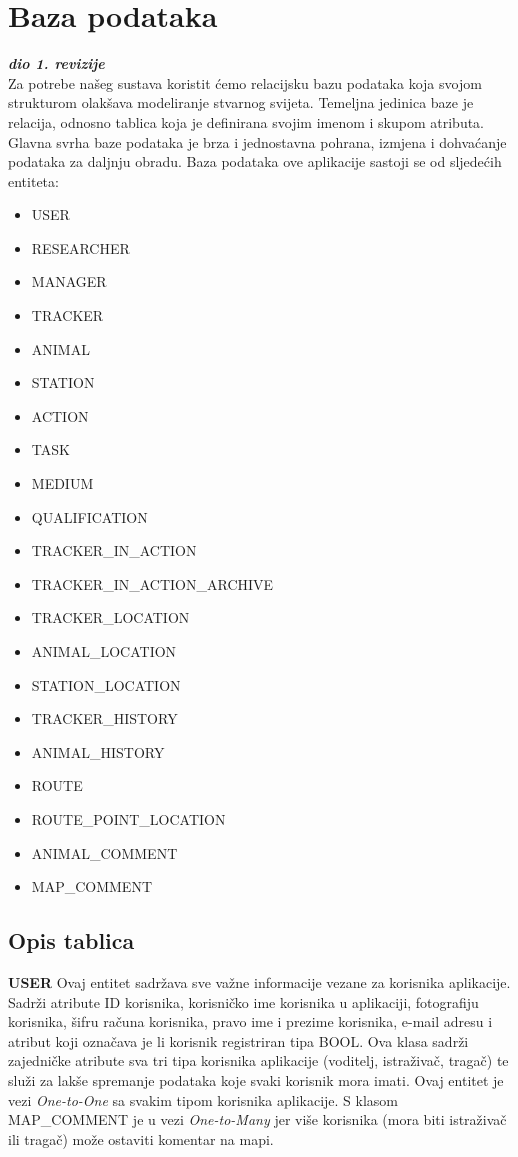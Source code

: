 				
		\section{Baza podataka}
			
			\textbf{\textit{dio 1. revizije}}\\			
		
			
				\noindent Za potrebe našeg sustava koristit ćemo relacijsku bazu podataka koja svojom strukturom olakšava modeliranje stvarnog svijeta. Temeljna jedinica baze je relacija, odnosno tablica koja je definirana svojim imenom i skupom atributa. Glavna svrha baze podataka je brza i jednostavna pohrana, izmjena i dohvaćanje podataka za daljnju obradu. Baza podataka ove aplikacije sastoji se od sljedećih entiteta:
				
				\begin{itemize}
					\item USER
					\item RESEARCHER
					\item MANAGER
					\item TRACKER
					\item ANIMAL
					\item STATION
					\item ACTION
					\item TASK
					\item MEDIUM
					\item QUALIFICATION
					\item TRACKER\_IN\_ACTION
					\item TRACKER\_IN\_ACTION\_ARCHIVE
					\item TRACKER\_LOCATION
					\item ANIMAL\_LOCATION
					\item STATION\_LOCATION
					\item TRACKER\_HISTORY
					\item ANIMAL\_HISTORY
					\item ROUTE
					\item ROUTE\_POINT\_LOCATION
					\item ANIMAL\_COMMENT
					\item MAP\_COMMENT
				\end{itemize}
				
		\subsection{Opis tablica}
				
				
				\noindent \textbf{USER} \hspace{1em} Ovaj entitet sadržava sve važne informacije vezane za korisnika aplikacije. Sadrži atribute ID korisnika, korisničko ime korisnika u aplikaciji, fotografiju korisnika, šifru računa korisnika, pravo ime i prezime korisnika, e-mail adresu i atribut koji označava je li korisnik registriran tipa BOOL.  Ova klasa sadrži zajedničke atribute sva tri tipa korisnika aplikacije (voditelj, istraživač, tragač) te služi za lakše spremanje podataka koje svaki korisnik mora imati. Ovaj entitet je  vezi \textit{One-to-One} sa svakim tipom korisnika aplikacije. S klasom MAP\_COMMENT je u vezi \textit{One-to-Many} jer više korisnika (mora biti istraživač ili tragač) može ostaviti komentar na mapi.
				
